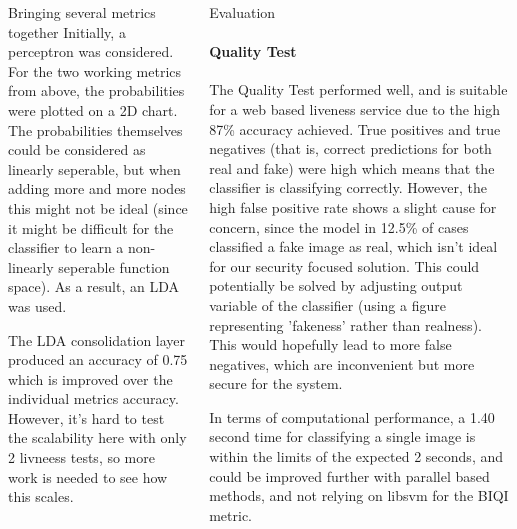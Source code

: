 \documentclass[final]{beamer}
\begin{document}
\begin{frame}{}
\begin{columns}[t]
\begin{column}{.48\linewidth}
\begin{block}{Bringing several metrics together}
          Initially, a perceptron was considered. For the two working metrics from above, the probabilities were plotted on a 2D chart. The probabilities themselves could be considered as linearly seperable, but
          when adding more and more nodes this might not be ideal (since it might be difficult for the classifier to learn a non-linearly seperable function space). As a result, an LDA was used.

          The LDA consolidation layer produced an accuracy of 0.75 which is improved over the individual metrics accuracy. However, it's hard to test the scalability here with only 2 livneess tests, so more work is needed to
          see how this scales.
        \end{block}

      \end{column}


      \begin{column}{.48\linewidth}

        \begin{block}{Evaluation}
          \paragraph{Quality Test}
          The Quality Test performed well, and is suitable for a web based liveness service due to the high 87\% accuracy achieved.
          True positives and true negatives (that is, correct predictions for both real and fake) were high which means that the classifier
          is classifying correctly. However, the high false positive rate shows a slight cause for concern, since the model in 12.5\% of cases
          classified a fake image as real, which isn't ideal for our security focused solution. This could potentially be solved by adjusting output
          variable of the classifier (using a figure representing 'fakeness' rather than realness). This would hopefully lead to more false negatives,
          which are inconvenient but more secure for the system.

          In terms of computational performance, a 1.40 second time for classifying a single image is within the limits of the expected 2 seconds, and could be improved further
          with parallel based methods, and not relying on libsvm for the BIQI metric.

\end{block}
\end{column}
\end{columns}
\end{frame}
\end{document}
